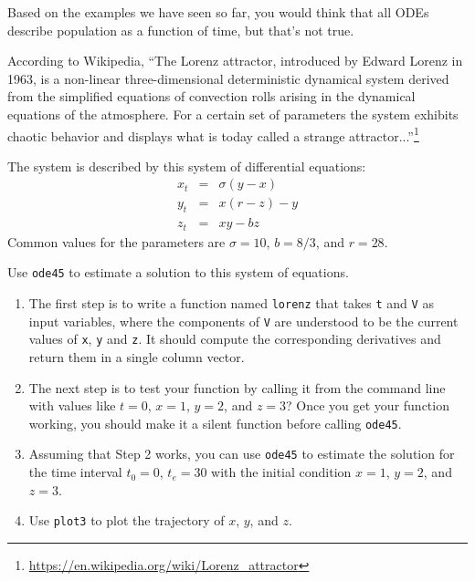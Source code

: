 \documentclass[
]{book}
\begin{document}
\begin{ex}

Based on the examples we have seen so far, you would think that
all ODEs describe population as
a function of time, but that's not true.

According to Wikipedia,
``The Lorenz attractor, introduced by Edward Lorenz in 1963, is a
non-linear three-dimensional deterministic dynamical system derived
from the simplified equations of convection rolls arising in the
dynamical equations of the atmosphere. For a certain set of parameters
the system exhibits chaotic behavior and displays what is today called
a strange attractor...''\footnote{\url{https://en.wikipedia.org/wiki/Lorenz_attractor}}

The system is described by this system of differential equations:
%
\begin{eqnarray}
x_t &=& \sigma (y - x)  \\
y_t &=& x (r - z) - y   \\
z_t &=& xy - b z
\end{eqnarray}
%
Common values for the parameters are $\sigma = 10$, $b = 8/3$, and $r=28$.

Use {\tt ode45} to estimate a solution to this
system of equations.


\begin{enumerate}

\item  The first step is to write a function named {\tt lorenz} that
takes {\tt t} and {\tt V} as input variables, where the components
of {\tt V} are understood to be the current values of {\tt x},
{\tt y} and {\tt z}.  It should compute the corresponding derivatives
and return them in a single column vector.

\item The next step is to test your function by calling it from
the command line with values like
$t=0$, $x=1$, $y=2$, and $z=3$?  Once you get your function working,
you should make it a silent function before calling {\tt ode45}.

\item Assuming that Step 2 works, you can use {\tt ode45}
to estimate the solution for the time interval $t_0 = 0$, $t_e = 30$
with the initial condition $x=1$, $y=2$, and $z=3$.

\item Use {\tt plot3} to plot the trajectory of
$x$, $y$, and $z$.

\end{enumerate}

\end{ex}
\end{document}
